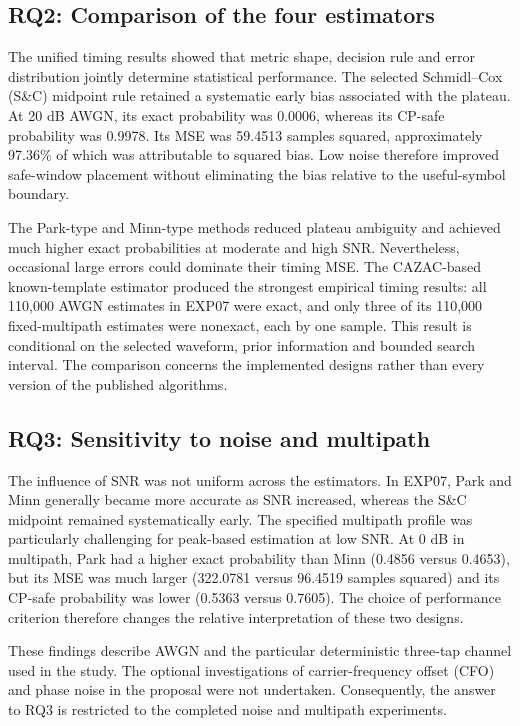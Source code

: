 \subsection*{RQ2: Comparison of the four estimators}

The unified timing results showed that metric shape, decision rule and
error distribution jointly determine statistical performance. The selected
Schmidl--Cox (S\&C) midpoint rule retained a systematic early bias associated
with the plateau. At 20 dB AWGN, its exact probability was 0.0006,
whereas its CP-safe probability was 0.9978. Its MSE was 59.4513 samples
squared, approximately 97.36\% of which was attributable to squared
bias. Low noise therefore improved safe-window placement without
eliminating the bias relative to the useful-symbol boundary.

The Park-type and Minn-type methods reduced plateau ambiguity and
achieved much higher exact probabilities at moderate and high SNR.
Nevertheless, occasional large errors could dominate their timing MSE.
The CAZAC-based known-template estimator produced the strongest
empirical timing results: all 110,000 AWGN estimates in EXP07 were
exact, and only three of its 110,000 fixed-multipath estimates were
nonexact, each by one sample. This result is conditional on the selected
waveform, prior information and bounded search interval. The comparison
concerns the implemented designs rather than every version of the
published algorithms.

\subsection*{RQ3: Sensitivity to noise and multipath}

The influence of SNR was not uniform across the estimators. In EXP07,
Park and Minn generally became more accurate as SNR increased, whereas
the S\&C midpoint remained systematically early. The specified multipath
profile was particularly challenging for peak-based estimation at low SNR.
At 0 dB in multipath, Park had a higher exact probability than Minn
(0.4856 versus 0.4653), but its MSE was much larger (322.0781 versus
96.4519 samples squared) and its CP-safe probability was lower (0.5363
versus 0.7605). The choice of performance criterion therefore changes the
relative interpretation of these two designs.

These findings describe AWGN and the particular deterministic three-tap
channel used in the study. The optional investigations of carrier-frequency
offset (CFO) and phase noise in the proposal were not undertaken.
Consequently, the answer to RQ3 is restricted to the completed noise
and multipath experiments.

